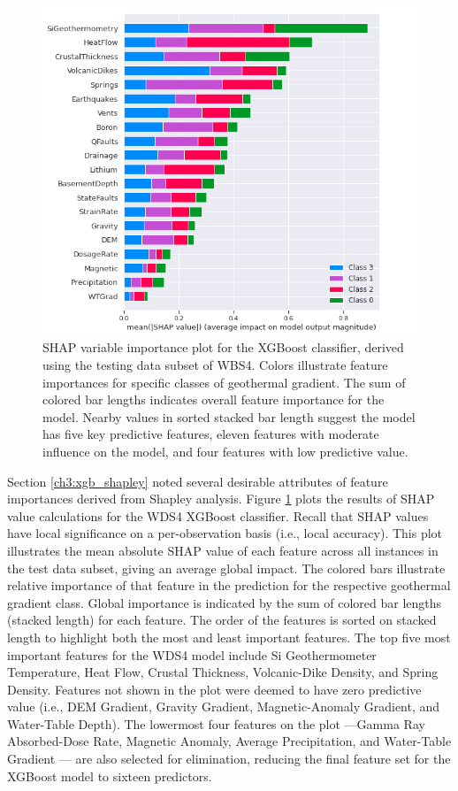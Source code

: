 \begin{figure}
\centering
\includegraphics[width=\textwidth]{templates/images/Figure-Shapley_notitle.png}
\caption[XGBoost SHAP variable importance]{SHAP variable importance plot for the XGBoost classifier, derived using the testing data subset of WBS4. Colors illustrate feature importances for specific classes of geothermal gradient. The sum of colored bar lengths indicates overall feature importance for the model. Nearby values in sorted stacked bar length suggest the model has five key predictive features, eleven features with moderate influence on the model, and four features with low predictive value.}
\label{fig:xgb_shap_global}
\end{figure}

Section \ref{ch3:xgb_shapley} noted several desirable attributes of feature importances derived from Shapley analysis. Figure \ref{fig:xgb_shap_global} plots the results of SHAP value calculations for the WDS4 XGBoost classifier. Recall that SHAP values have local significance on a per-observation basis (i.e., local accuracy). This plot illustrates the mean absolute SHAP value of each feature across all instances in the test data subset, giving an average global impact. The colored bars illustrate relative importance of that feature in the prediction for the respective geothermal gradient class. Global importance is indicated by the sum of colored bar lengths (stacked length) for each feature. The order of the features is sorted on stacked length to highlight both the most and least important features. The top five most important features for the WDS4 model include Si Geothermometer Temperature, Heat Flow, Crustal Thickness, Volcanic-Dike Density, and Spring Density. Features not shown in the plot were deemed to have zero predictive value (i.e., DEM Gradient, Gravity Gradient, Magnetic-Anomaly Gradient, and Water-Table Depth). The lowermost four features on the plot ---Gamma Ray Absorbed-Dose Rate, Magnetic Anomaly, Average Precipitation, and Water-Table Gradient --- are also selected for elimination, reducing the final feature set for the XGBoost model to sixteen predictors.

